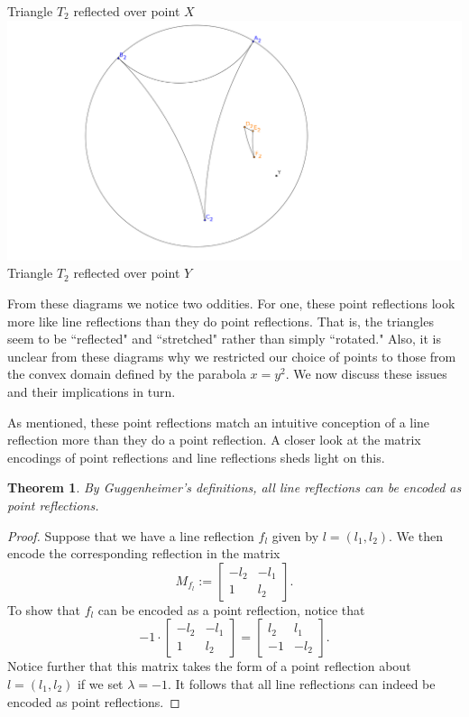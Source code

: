 \documentclass[12pt]{article}
\newcommand{\lftmat}[4]{\begin{bmatrix} {#1} & {#2} \\ {#3} & {#4} \end{bmatrix}}
\newcommand{\linenoendmat}[2]{\begin{bmatrix} -{#2} & -{#1} \\ 1 & {#2} \end{bmatrix}}
\newcommand{\stanlinenoendmat}{\linenoendmat{l_1}{l_2}}
\theoremstyle{plain}
\newtheorem{theorem}{Theorem}[section]
\theoremstyle{definition}
\begin{document}
\begin{center}
Triangle $T_2$ reflected over point $X$
\[\]
\includegraphics[width=160mm]{../images/t2_over_y.png} \\
Triangle $T_2$ reflected over point $Y$ 
\end{center}
\fi


From these diagrams we notice two oddities. For one, these point reflections look more like line reflections than they do point reflections. That is, the triangles seem to be ``reflected" and ``stretched" rather than simply ``rotated." Also, it is unclear from these diagrams why we restricted our choice of points to those from the convex domain defined by the parabola $x = y^2$. We now discuss these issues and their implications in turn.

As mentioned, these point reflections match an intuitive conception of a line reflection more than they do a point reflection. A closer look at the matrix encodings of point reflections and line reflections sheds light on this. 

\begin{theorem}
By Guggenheimer's definitions, all line reflections can be encoded as point reflections. 
\end{theorem}

\begin{proof}
Suppose that we have a line reflection $f_l$ given by $l = (l_1, l_2)$. We then encode the corresponding reflection in the matrix 
\[ M_{f_l} := \stanlinenoendmat. \]
To show that $f_l$ can be encoded as a point reflection, notice that 
\[ -1 \cdot \stanlinenoendmat = \lftmat{l_2}{l_1}{-1}{-l_2}.\]
Notice further that this matrix takes the form of a point reflection about $l = (l_1, l_2)$ if we set $\lambda = -1$. It follows that all line reflections can indeed be encoded as point reflections.
\end{proof}
\end{document}
